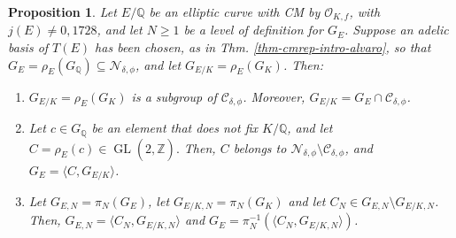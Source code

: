 \documentclass[11pt]{amsart}
\newtheorem{prop}[defn]{Proposition}
\theoremstyle{definition}
\newcommand{\Q}{\mathbb{Q}}
\newcommand{\Z}{\mathbb{Z}}
\newcommand{\Of}{\mathcal{O}_{K,f}}
\newcommand{\GL}{\operatorname{GL}}
\begin{document}
\begin{prop}\label{prop-reconstructimage}
    Let $E/\Q$ be an  elliptic curve with CM by $\Of$, with $j(E)\neq 0,1728$, and let $N\geq 1$ be a level of definition for $G_E$. Suppose an adelic basis of $T(E)$ has been chosen, as in Thm. \ref{thm-cmrep-intro-alvaro}, so that $G_E=\rho_E(G_\Q)\subseteq \mathcal{N}_{\delta, \phi}$, and let $G_{E/K}=\rho_E(G_K)$. Then:
    \begin{enumerate}
        \item $G_{E/K}=\rho_E(G_K)$ is a subgroup of $\mathcal{C}_{\delta, \phi}$. Moreover, $G_{E/K}=G_E\cap \mathcal{C}_{\delta, \phi}$.
        \item Let $c\in G_\Q$ be an element that does not fix $K/\Q$, and let $C=\rho_E(c)\in \GL(2,\widehat{\Z}).$ Then, $C$ belongs to $\mathcal{N}_{\delta, \phi}\setminus \mathcal{C}_{\delta, \phi}$, and $G_E=\langle C, G_{E/K} \rangle$.
        \item Let $G_{E,N}=\pi_{N}(G_E)$, let $G_{E/K,N}=\pi_{N}(G_K)$ and let $C_N \in G_{E,N}\setminus G_{E/K,N}$. Then, $G_{E,N}=\langle C_N, G_{E/K,N}\rangle$ and $G_E=\pi^{-1}_{N}(\langle C_N, G_{E/K,N}\rangle)$.
    \end{enumerate}
\end{prop}
\end{document}
